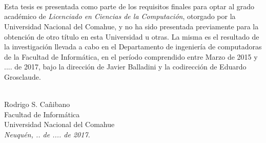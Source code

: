 \ \\
\ \\
\label{pagpref}
\\
\ \\
\ \\

\ \\

\ \\
\ \\


Esta tesis es presentada como parte de los requisitos finales para optar al
grado académico de {\em Licenciado en Ciencias de la Computación}, otorgado por
la Universidad Nacional del Comahue, y no ha sido presentada previamente para la
obtención de otro título en esta Universidad u otras. La misma es el resultado
de la investigación llevada a cabo en el Departamento de ingeniería de
computadoras de la Facultad de Informática, en el período comprendido entre
Marzo de 2015 y .... de 2017, bajo la dirección de Javier Balladini y la
codirección de Eduardo Grosclaude.

\vspace{3cm}


\ \\
{\flushright Rodrigo S. Cañibano\\
{\sc Facultad de Informática \\
Universidad Nacional del Comahue}\\
{\em Neuquén, .. de .... de 2017.}\\}

\vfill

